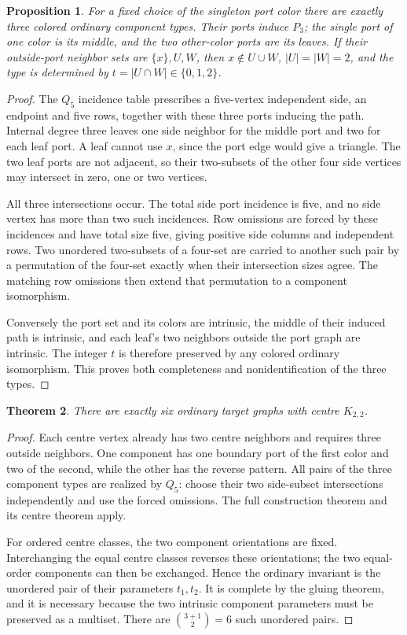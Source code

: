 \documentclass[11pt]{article}
\newtheorem{theorem}{Theorem}
\newtheorem{proposition}[theorem]{Proposition}
\begin{document}
\begin{proposition}\label{k22legs}
For a fixed choice of the singleton port color there are exactly three
colored ordinary component types. Their ports induce $P_3$; the single
port of one color is its middle, and the two other-color ports are its
leaves. If their outside-port neighbor sets are $\{x\},U,W$, then
$x\notin U\cup W$, $|U|=|W|=2$, and the type is determined by
$t=|U\cap W|\in\{0,1,2\}$.
\end{proposition}
\begin{proof}
The $Q_5$ incidence table prescribes a five-vertex independent side,
an endpoint and five rows, together with these three ports inducing
the path. Internal degree three leaves one side neighbor for the
middle port and two for each leaf port. A leaf cannot use $x$, since
the port edge would give a triangle. The two leaf ports are not adjacent,
so their two-subsets of the other four side vertices may intersect in
zero, one or two vertices.

All three intersections occur. The total side port incidence is five,
and no side vertex has more than two such incidences. Row omissions
are forced by these incidences and have total size five, giving positive
side columns and independent rows. Two unordered two-subsets of a
four-set are carried to another such pair by a permutation of the
four-set exactly when their intersection sizes agree. The matching row
omissions then extend that permutation to a component isomorphism.

Conversely the port set and its colors are intrinsic, the middle of
their induced path is intrinsic, and each leaf's two neighbors outside
the port graph are intrinsic. The integer $t$ is therefore preserved
by any colored ordinary isomorphism. This proves both completeness and
nonidentification of the three types.
\end{proof}

\begin{theorem}\label{k22count}
There are exactly six ordinary target graphs with centre $K_{2,2}$.
\end{theorem}
\begin{proof}
Each centre vertex already has two centre neighbors and requires three
outside neighbors. One component has one boundary port of the first
color and two of the second, while the other has the reverse pattern.
All pairs of the three component types are realized by $Q_5$: choose
their two side-subset intersections independently and use the forced
omissions. The full construction theorem and its centre theorem apply.

For ordered centre classes, the two component orientations are fixed.
Interchanging the equal centre classes reverses these orientations;
the two equal-order components can then be exchanged. Hence the ordinary
invariant is the unordered pair of their parameters $t_1,t_2$.
It is complete by the gluing theorem, and it is necessary because the
two intrinsic component parameters must be preserved as a multiset.
There are $\binom{3+1}{2}=6$ such unordered pairs.
\end{proof}
\end{document}
